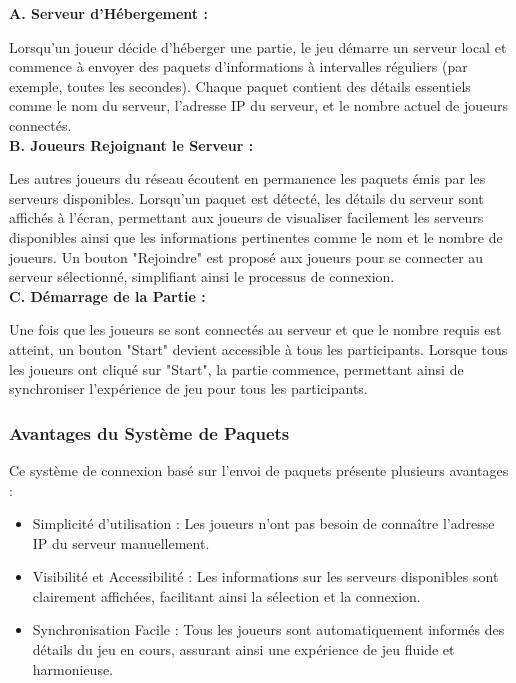 \textbf{A. Serveur d'Hébergement :}
\vspace*{0.2cm}

Lorsqu'un joueur décide d'héberger une partie, le jeu démarre un serveur local et commence à envoyer des paquets d'informations à intervalles réguliers
(par exemple, toutes les secondes).
Chaque paquet contient des détails essentiels comme le nom du serveur, l'adresse IP du serveur, et le nombre actuel de joueurs connectés.
\\

\textbf{B. Joueurs Rejoignant le Serveur :}
\vspace*{0.2cm}

Les autres joueurs du réseau écoutent en permanence les paquets émis par les serveurs disponibles.
Lorsqu'un paquet est détecté, les détails du serveur sont affichés à l'écran, permettant aux joueurs de visualiser facilement les serveurs disponibles ainsi que les informations pertinentes comme le nom et le nombre de joueurs.
Un bouton "Rejoindre" est proposé aux joueurs pour se connecter au serveur sélectionné, simplifiant ainsi le processus de connexion.
\\

\textbf{C. Démarrage de la Partie :}
\vspace*{0.2cm}

Une fois que les joueurs se sont connectés au serveur et que le nombre requis est atteint, un bouton "Start" devient accessible à tous les participants.
Lorsque tous les joueurs ont cliqué sur "Start", la partie commence, permettant ainsi de synchroniser l'expérience de jeu pour tous les participants.

\subsubsection{Avantages du Système de Paquets}

Ce système de connexion basé sur l'envoi de paquets présente plusieurs avantages :
\\

\begin{itemize}
      \item Simplicité d'utilisation : Les joueurs n'ont pas besoin de connaître l'adresse IP du serveur manuellement.
            \\

      \item Visibilité et Accessibilité : Les informations sur les serveurs disponibles sont clairement affichées, facilitant ainsi la sélection et la connexion.
            \\

      \item Synchronisation Facile : Tous les joueurs sont automatiquement informés des détails du jeu en cours, assurant ainsi une expérience de jeu fluide et harmonieuse.
\end{itemize}

